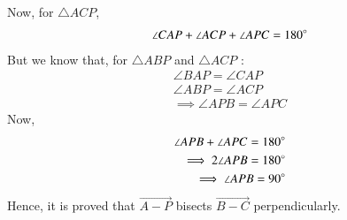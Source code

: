 \documentclass[journal,12pt,twocolumn]{IEEEtran}
\renewcommand\thesection{\arabic{section}}
\begin{document}
Now, for $\triangle ACP$,
\begin{align}
\angle CAP + \angle ACP + \angle APC = 180 \degree
\end{align}
But we know that, for $\triangle ABP$ and $\triangle ACP$ :
\begin{align}
\angle BAP = \angle CAP \\
\angle ABP = \angle ACP \\
\implies \angle APB = \angle APC
\end{align}
Now,
\begin{align}
\angle APB + \angle APC = 180 \degree\\
\implies 2 \angle APB = 180 \degree\\
\implies  \angle APB = 90 \degree\\
\end{align}
Hence, it is proved that $\vec{A-P}$ bisects $\vec{B-C}$ perpendicularly.
\renewcommand{\theequation}{\theenumi}
%
\end{document}
